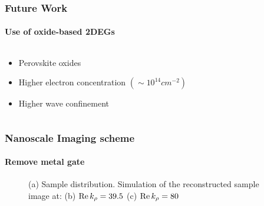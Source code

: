 \documentclass[mathserif,18pt,xcolor=table]{beamer}
\begin{document}
\begin{frame}
  \frametitle{Future Work}
  \framesubtitle{Use of oxide-based 2DEGs}
  \begin{columns}[T] %
    \begin{column}{.5\textwidth}
      \begin{itemize}
        \item Perovskite oxides
        \item Higher electron concentration $( \sim 10^{14} cm^{-2})$
        \item Higher wave confinement
      \end{itemize}
    \end{column}
    \begin{column}[T]{.5\textwidth}
      \end{column}%
    \end{columns}
  \end{frame}
\begin{frame}
  \frametitle{Nanoscale Imaging scheme}
  \framesubtitle{Remove metal gate}
      \begin{figure}[t!]
         \hfil
         \hfil
        \caption{(a) Sample distribution. Simulation of the reconstructed sample image at: (b) $\Re k_{\rho} = 39.5$ (c) $\Re k_{\rho} = 80$}
        \label{fig:simulation}
      \end{figure}
\end{frame}
\end{document}
